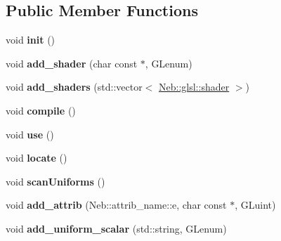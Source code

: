 \subsection*{Public Member Functions}
\begin{DoxyCompactItemize}
\item 
\hypertarget{classNeb_1_1glsl_1_1program_a08f76e03821552f84bd29136bf6bfee0}{void {\bfseries init} ()}\label{classNeb_1_1glsl_1_1program_a08f76e03821552f84bd29136bf6bfee0}

\item 
\hypertarget{classNeb_1_1glsl_1_1program_adf4e183d4d8fe9eeb51fc9228e7e7466}{void {\bfseries add\-\_\-shader} (char const $\ast$, G\-Lenum)}\label{classNeb_1_1glsl_1_1program_adf4e183d4d8fe9eeb51fc9228e7e7466}

\item 
\hypertarget{classNeb_1_1glsl_1_1program_acd96fbde1e8d4166dac27a206dfedb92}{void {\bfseries add\-\_\-shaders} (std\-::vector$<$ \hyperlink{classNeb_1_1glsl_1_1shader}{Neb\-::glsl\-::shader} $>$)}\label{classNeb_1_1glsl_1_1program_acd96fbde1e8d4166dac27a206dfedb92}

\item 
\hypertarget{classNeb_1_1glsl_1_1program_a715bfbf117521d603ad319186e3de2bb}{void {\bfseries compile} ()}\label{classNeb_1_1glsl_1_1program_a715bfbf117521d603ad319186e3de2bb}

\item 
\hypertarget{classNeb_1_1glsl_1_1program_a6bd27788c6eb2e0be2f852cde11940f9}{void {\bfseries use} ()}\label{classNeb_1_1glsl_1_1program_a6bd27788c6eb2e0be2f852cde11940f9}

\item 
\hypertarget{classNeb_1_1glsl_1_1program_a9e3346e5f38bf0912776ffcfe6ae5806}{void {\bfseries locate} ()}\label{classNeb_1_1glsl_1_1program_a9e3346e5f38bf0912776ffcfe6ae5806}

\item 
\hypertarget{classNeb_1_1glsl_1_1program_aa74a1d15b98280964cb658b7bc5eeaff}{void {\bfseries scan\-Uniforms} ()}\label{classNeb_1_1glsl_1_1program_aa74a1d15b98280964cb658b7bc5eeaff}

\item 
\hypertarget{classNeb_1_1glsl_1_1program_a1f0afccbe7c4c3a49f9e7160d8df47b3}{void {\bfseries add\-\_\-attrib} (Neb\-::attrib\-\_\-name\-::e, char const $\ast$, G\-Luint)}\label{classNeb_1_1glsl_1_1program_a1f0afccbe7c4c3a49f9e7160d8df47b3}

\item 
\hypertarget{classNeb_1_1glsl_1_1program_a216f4da05c9652196ace84de8f6f72a4}{void {\bfseries add\-\_\-uniform\-\_\-scalar} (std\-::string, G\-Lenum)}\label{classNeb_1_1glsl_1_1program_a216f4da05c9652196ace84de8f6f72a4}


\end{DoxyCompactItemize}

